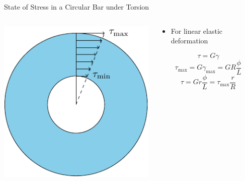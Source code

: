 \documentclass[10pt, svgnames]{beamer}
\begin{document}
\begin{frame}[label={sec:org6ec797a}]{State of Stress in a Circular Bar under Torsion}
\begin{columns}
\begin{column}{0.5\columnwidth}
\begin{center}
\includegraphics[width=.9\linewidth]{pictures/shear-distribution.pdf}
\end{center}
\end{column}

\begin{column}{0.5\columnwidth}
\begin{itemize}
\item For linear elastic deformation
\end{itemize}

\[\tau = G \gamma\]
\[\tau_{\max} = G\gamma_{\max} = GR \frac{\phi}{L}\]
\[\tau = Gr\frac{\phi}{L} = \tau_{\max} \frac{r}{R}\]
\end{column}
\end{columns}
\end{frame}
\end{document}
